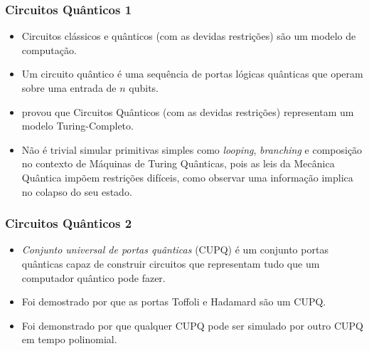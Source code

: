 \documentclass{beamer}
\begin{document}
\begin{frame}
\frametitle{Circuitos Quânticos 1}
\begin{itemize}
  \item Circuitos clássicos e quânticos (com as devidas restrições) são um modelo de computação.
  \item Um circuito quântico é uma sequência de portas lógicas quânticas que
    operam sobre uma entrada de $n$ qubits.
  \item  \cite{be:97} provou que Circuitos Quânticos (com as devidas restrições)
    representam um modelo Turing-Completo.
  \item Não é trivial simular primitivas simples como
    \textit{looping}, \textit{branching} e composição no contexto de
    Máquinas de Turing Quânticas, pois as leis da Mecânica Quântica
    impõem restrições difíceis, como observar uma informação implica
    no colapso do seu estado.
\end{itemize}
\end{frame}

\begin{frame}
\frametitle{Circuitos Quânticos 2}
\begin{itemize}
  \item \textit{Conjunto universal de portas quânticas}
    (CUPQ) é um conjunto portas quânticas capaz de construir circuitos
    que representam tudo que um computador quântico pode fazer.
  \item Foi demostrado por \cite{shi:03} que as portas Toffoli e
    Hadamard são um CUPQ.
  \item Foi demonstrado por \cite{da:06} que qualquer CUPQ pode
    ser simulado por outro CUPQ em tempo polinomial.
\end{itemize}
\end{frame}
\end{document}
